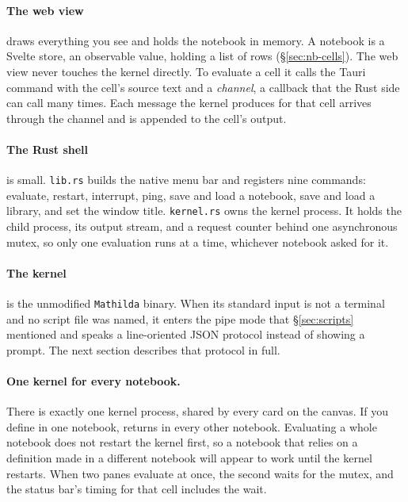 \paragraph{The web view} draws everything you see and holds the notebook in
memory. A notebook is a Svelte store, an observable value, holding a list of
rows (\S\ref{sec:nb-cells}). The web view never touches the kernel directly.
To evaluate a cell it calls the Tauri command  with the
cell's source text and a \emph{channel}, a callback that the Rust side can
call many times. Each message the kernel produces for that cell arrives
through the channel and is appended to the cell's output.

\paragraph{The Rust shell} is small. \texttt{lib.rs} builds the native menu
bar and registers nine commands: evaluate, restart, interrupt, ping, save and
load a notebook, save and load a library, and set the window title.
\texttt{kernel.rs} owns the kernel process. It holds the child process, its
output stream, and a request counter behind one asynchronous mutex, so only
one evaluation runs at a time, whichever notebook asked for it.

\paragraph{The kernel} is the unmodified \texttt{Mathilda} binary. When its
standard input is not a terminal and no script file was named, it enters the
pipe mode that \S\ref{sec:scripts} mentioned and speaks a line-oriented JSON
protocol instead of showing a prompt. The next section describes that
protocol in full.%

\paragraph{One kernel for every notebook.} There is exactly one kernel
process, shared by every card on the canvas.
If you define  in one notebook,  returns
 in every other notebook. Evaluating a whole notebook does not
restart the kernel first, so a notebook that relies on a definition made in a
different notebook will appear to work until the kernel restarts. When two
panes evaluate at once, the second waits for the mutex, and the status bar's
timing for that cell includes the wait.

